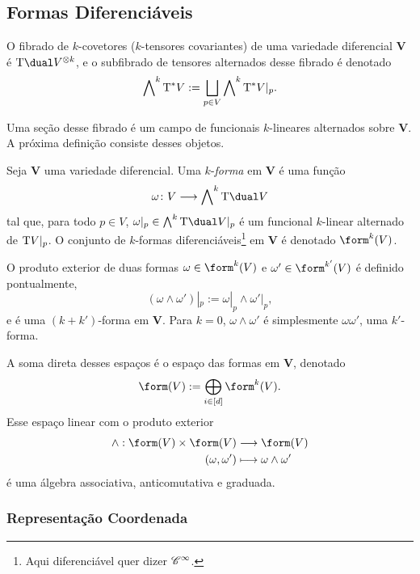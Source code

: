 \subsection{Formas Diferenciáveis}

O fibrado de $k$-covetores ($k$-tensores covariantes) de uma variedade diferencial $\bm V$ é $\Tg\dual V^{\otimes k}$, e o subfibrado de tensores alternados desse fibrado é denotado
	\begin{equation*}
	\bigwedge\nolimits^k \mathrm{T}^* V := \bigsqcup_{p \in V} \bigwedge\nolimits^k \mathrm{T}^* V|_p.
	\end{equation*}

Uma seção desse fibrado é um campo de funcionais $k$-lineares alternados sobre $\bm V$. A próxima definição consiste desses objetos.

\begin{defi}
Seja $\bm V$ uma variedade diferencial. Uma $k$-\emph{forma} em $\bm V$ é uma função
	\begin{equation*}
	\omega\colon V \to \bigwedge\nolimits^k \Tg\dual V
	\end{equation*}
tal que, para todo $p \in V$, $\omega|_p \in \bigwedge^k\Tg\dual V|_p$ é um funcional $k$-linear alternado de $\mathrm{T} V|_p$. O conjunto de $k$-formas diferenciáveis\footnote{Aqui diferenciável quer dizer $\mathscr{C}^\infty$.} em $\bm V$ é denotado $\form^k (V)$.
\end{defi}

O produto exterior de duas formas $\omega \in \form^k (V)$ e $\omega' \in \form^{k'} (V)$ é definido pontualmente,
	\begin{equation*}
	(\omega \wedge \omega')|_p := \omega|_p \wedge \omega'|_p,
	\end{equation*}
e é uma $(k+k')$-forma em $\bm V$. Para $k=0$, $\omega \wedge \omega'$ é simplesmente $\omega\omega'$, uma $k'$-forma.

A soma direta desses espaços é o espaço das formas em $\bm V$, denotado
	\begin{equation*}
	\form (V) := \bigoplus_{i \in [d]} \form^k (V).
	\end{equation*}
Esse espaço linear com o produto exterior
	\begin{align*}
	\func{\wedge}{\form (V) \times \form (V)}{\form (V)}{(\omega,\omega')}{\omega \wedge \omega'}
	\end{align*}
é uma álgebra associativa, anticomutativa e graduada.

\subsubsection{Representação Coordenada}

